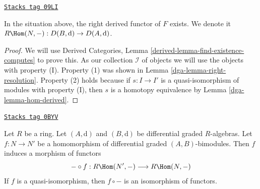 \begin{lemma}
\label{dga-lemma-derived-restriction}
\href{https://stacks.math.columbia.edu/tag/09LI}{\texttt{Stacks tag 09LI}}

In the situation above, the right derived functor of $F$ exists.
We denote it $R\Hom(N, -) : D(B, \text{d}) \to D(A, \text{d})$.
\end{lemma}

\begin{proof}

We will use
Derived Categories, Lemma \ref{derived-lemma-find-existence-computes}
to prove this. As our collection $\mathcal{I}$
of objects we will use the objects with property (I).
Property (1) was shown in Lemma \ref{dga-lemma-right-resolution}.
Property (2) holds because if $s : I \to I'$ is a quasi-isomorphism
of modules with property (I), then $s$ is a homotopy equivalence
by Lemma \ref{dga-lemma-hom-derived}.
\end{proof}

\begin{lemma}
\label{dga-lemma-functoriality-derived-restriction}
\href{https://stacks.math.columbia.edu/tag/0BYV}{\texttt{Stacks tag 0BYV}}

Let $R$ be a ring. Let $(A, \text{d})$ and $(B, \text{d})$ be
differential graded $R$-algebras. Let $f : N \to N'$ be a
homomorphism of differential graded $(A, B)$-bimodules.
Then $f$ induces a morphism of functors
$$
- \circ f : R\Hom(N', -) \longrightarrow R\Hom(N, -)
$$
If $f$ is a quasi-isomorphism, then $f \circ -$ is an isomorphism of
functors.
\end{lemma}

